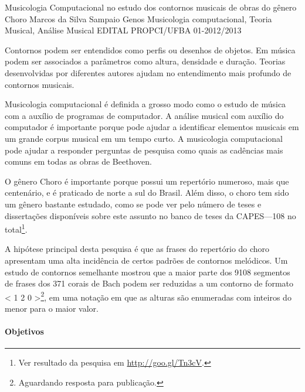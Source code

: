 \documentclass[11pt]{article}
\begin{document}

\dadosProjetoOrientador
{Musicologia Computacional no estudo dos contornos musicais de obras
  do gênero Choro}
{Marcos da Silva Sampaio}
{Genos}
{Musicologia computacional, Teoria Musical, Análise Musical}
{EDITAL PROPCI/UFBA 01-2012/2013}

\newpage

\onehalfspace


Contornos podem ser entendidos como perfis ou desenhos de objetos. Em
música podem ser associados a parâmetros como altura, densidade e
duração. Teorias desenvolvidas por diferentes autores
\cite{Friedmann1985,Morris1987,Marvin1988,Bor2009} ajudam no
entendimento mais profundo de contornos musicais.

Musicologia computacional é definida a grosso modo como o estudo de
música com a auxílio de programas de computador. A análise musical com
auxílio do computador é importante porque pode ajudar a identificar
elementos musicais em um grande corpus musical em um tempo curto. A
musicologia computacional pode ajudar a responder perguntas de
pesquisa como quais as cadências mais comuns em todas as obras de
Beethoven.

O gênero Choro é importante porque possui um repertório numeroso, mais
que centenário, e é praticado de norte a sul do Brasil. Além disso, o
choro tem sido um gênero bastante estudado, como se pode ver pelo
número de teses e dissertações disponíveis sobre este assunto no banco
de teses da CAPES---108 no total\footnote{Ver resultado da pesquisa em
  \url{http://goo.gl/Tn3cV}.}.

A hipótese principal desta pesquisa é que as frases do repertório do
choro apresentam uma alta incidência de certos padrões de contornos
melódicos. Um estudo de contornos semelhante mostrou que a maior parte
dos 9108 segmentos de frases dos 371 corais de Bach podem ser
reduzidas a um contorno de formato < 1 2 0 >\footnote{Aguardando
  resposta para publicação.}, em uma notação em que as alturas são
enumeradas com inteiros do menor para o maior valor.

\paragraph{Objetivos}
\label{sec:objetivos}
\end{document}
